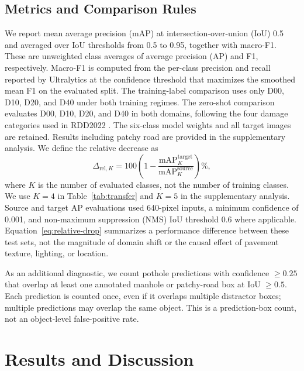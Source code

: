 \documentclass[conference]{IEEEtran}
\newif\ifdistractoranalysis \distractoranalysistrue %
\begin{document}
\subsection{Metrics and Comparison Rules}
We report mean average precision (mAP) at intersection-over-union (IoU) 0.5 and averaged over IoU thresholds from 0.5 to 0.95, together with macro-F1. These are unweighted class averages of average precision (AP) and F1, respectively. Macro-F1 is computed from the per-class precision and recall reported by Ultralytics at the confidence threshold that maximizes the smoothed mean F1 on the evaluated split. \ifdistractoranalysis The training-label comparison uses only D00, D10, D20, and D40 under both training regimes.\fi{} The zero-shot comparison evaluates D00, D10, D20, and D40 in both domains, following the four damage categories used in RDD2022 \cite{Arya2024846}. The six-class model weights and all target images are retained. Results including patchy road are provided in the supplementary analysis. We define the relative decrease as
\begin{equation}
\Delta_{\mathrm{rel},K} = 100\left(1-\frac{\mathrm{mAP}^{\mathrm{target}}_{K}}{\mathrm{mAP}^{\mathrm{source}}_{K}}\right)\%,
\label{eq:relative-drop}
\end{equation}
where $K$ is the number of evaluated classes, not the number of training classes. We use $K=4$ in Table~\ref{tab:transfer} and $K=5$ in the supplementary analysis. Source and target AP evaluations used 640-pixel inputs, a minimum confidence of 0.001, and non-maximum suppression (NMS) IoU threshold 0.6 where applicable. Equation~\eqref{eq:relative-drop} summarizes a performance difference between these test sets, not the magnitude of domain shift or the causal effect of pavement texture, lighting, or location.

\ifdistractoranalysis As an additional diagnostic, we count pothole predictions with confidence $\geq 0.25$ that overlap at least one annotated manhole or patchy-road box at IoU $\geq 0.5$. Each prediction is counted once, even if it overlaps multiple distractor boxes; multiple predictions may overlap the same object. This is a prediction-box count, not an object-level false-positive rate.\fi




\section{Results and Discussion}
\end{document}
